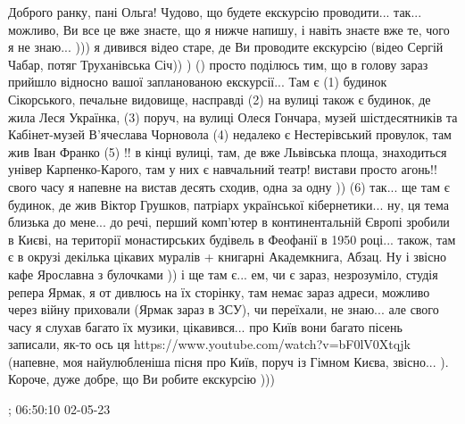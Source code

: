 Доброго ранку, пані Ольга! Чудово, що будете екскурсію проводити... так...
можливо, Ви все це вже знаєте, що я нижче напишу, і навіть знаєте вже те, чого
я не знаю... ))) я дивився відео старе, де Ви проводите екскурсію (відео Сергій
Чабар, потяг Труханівська Січ)) ) () просто поділюсь тим, що в голову зараз
прийшло відносно вашої запланованою екскурсії... Там є (1) будинок Сікорського,
печальне видовище, насправді (2) на вулиці також є будинок, де жила Леся
Українка, (3) поруч, на вулиці Олеся Гончара, музей шістдесятників та
Кабінет-музей В'ячеслава Чорновола (4) недалеко є Нестерівський провулок, там
жив Іван Франко (5) !! в кінці вулиці, там, де вже Львівська площа, знаходиться
універ Карпенко-Карого, там у них є навчальний театр! вистави просто агонь!!
свого часу я напевне на вистав десять сходив, одна за одну )) (6) так... ще там
є будинок, де жив Віктор Грушков, патріарх української кібернетики... ну, ця
тема близька до мене... до речі, перший комп'ютер в континентальній Європі
зробили в Києві, на території монастирських будівель в Феофанії в 1950 році...
також, там є в окрузі декілька цікавих муралів + книгарні Академкнига, Абзац.
Ну і звісно кафе Ярославна з булочками )) і ще там є... ем, чи є зараз,
незрозуміло, студія репера Ярмак, я от дивлюсь на їх сторінку, там немає зараз
адреси, можливо через війну приховали (Ярмак зараз в ЗСУ), чи переїхали, не
знаю... але свого часу я слухав багато їх музики, цікавився... про Київ вони
багато пісень записали, як-то ось ця
https://www.youtube.com/watch?v=bF0lV0Xtqjk (напевне, моя найулюбленіша пісня
про Київ, поруч із Гімном Києва, звісно... ). Короче, дуже добре, що Ви робите
екскурсію ))) 

;
06:50:10 02-05-23

